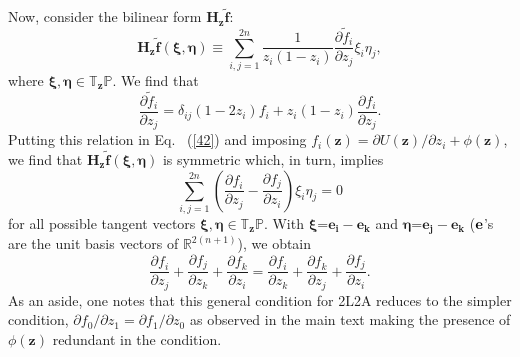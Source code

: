 \documentclass[
 pre,
 aps,
 a4paper,
 english,
 showkeys,
 reprint,
 twocolumn,
 superscriptaddress
]{revtex4}
\begin{document}
Now, consider the bilinear form $\boldsymbol{H_z \tilde{f}}$:
\begin{equation}\label{42}
\boldsymbol{H_z \tilde{f}}{(\boldsymbol{\xi}, \boldsymbol{\eta})}\equiv \sum_{i,j=1}^{2n}\frac{1}{z_{i}(1-z_{i})}\frac{\partial \tilde{f}_{i}}{\partial z_{j}}\xi_{i} \eta_{j},
\end{equation}
where $\boldsymbol{\xi, \eta} \in \mathbb{T}_{\boldsymbol{z}} \mathbb{P}$. We find that 
\begin{equation}\label{41}
\frac{\partial \tilde{f}_{i}}{\partial z_{j}}=\delta_{ij}(1-2z_{i})f_{i}+z_{i}(1-z_{i})\frac{\partial f_{i}}{\partial z_{j}}.
\end{equation}
Putting this relation in Eq.~ (\ref{42}) and imposing $f_i(\boldsymbol{z})={\partial U({\boldsymbol{z}})}/{\partial z_i}+\phi(\boldsymbol{z})$, we find that $\boldsymbol{H_z \tilde{f}}{(\boldsymbol{\xi}, \boldsymbol{\eta})}$ is symmetric which, in turn, implies
\begin{equation}
\sum_{i, j=1}^{2n}\left(\frac{\partial f_{i}}{\partial z_{j}}-\frac{\partial f_{j}}{\partial z_{i}}\right) \xi_{i}\eta_{j}=0
\end{equation}
for all possible tangent vectors $\boldsymbol{\xi, \eta}\in \mathbb{T}_{\boldsymbol{z}}\mathbb{P}$. With $\boldsymbol{\xi}$=$\mathbf{e_i-e_k}$ and $\boldsymbol{\eta}$=$\mathbf{e_j-e_k}$ (${\bf e}$'s are the unit basis vectors of $\mathbb{R}^{2(n+1)}$), we obtain
\begin{equation}\label{43}
\frac{\partial f_{i}}{\partial z_{j}}+\frac{\partial f_{j}}{\partial z_{k}}+\frac{\partial f_{k}}{\partial z_{i}}=\frac{\partial f_{i}}{\partial z_{k}}+\frac{\partial f_{k}}{\partial z_{j}}+\frac{\partial f_{j}}{\partial z_{i}}.
\end{equation}
As an aside, one notes that this general condition for 2L2A reduces to the simpler condition, $\partial f_0/\partial z_1=\partial f_1/\partial z_0$ as observed in the main text making the presence of $\phi(\boldsymbol{z})$ redundant in the condition.
\end{document}
